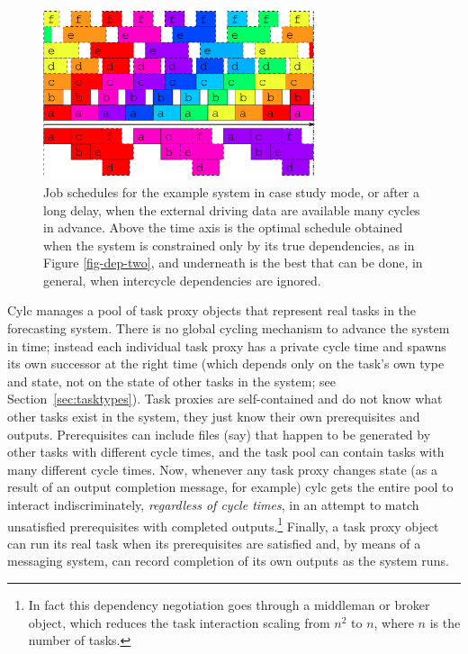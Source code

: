\documentclass[11pt,a4paper]{article}
\begin{document}
\begin{figure} 
    \begin{center} 
        \includegraphics[width=8cm]{inkscape-svg/timeline-two}
    \end{center} 
    \caption{\small Job schedules for the example system in case study
    mode, or after a long delay, when the external driving data are
    available many cycles in advance. Above the time axis is the optimal
    schedule obtained when the system is constrained only by its true
    dependencies, as in Figure \ref{fig-dep-two}, and underneath is
    the best that can be done, in general, when intercycle dependencies
    are ignored.} 
    \label{fig-time-two}
\end{figure} 

Cylc manages a pool of task proxy objects that represent real tasks in
the forecasting system. There is no global cycling mechanism to advance
the system in time; instead each individual task proxy has a private
cycle time and spawns its own successor at the right time (which depends
only on the task's own type and state, not on the state of other tasks
in the system; see Section~\ref{sec:tasktypes}). Task
proxies are self-contained and do not know what other tasks exist in the
system, they just know their own prerequisites and outputs.
Prerequisites can include files (say) that happen to be generated by
other tasks with different cycle times, and the task pool can contain
tasks with many different cycle times.  Now, whenever any task proxy
changes state (as a result of an output completion message, for example)
cylc gets the entire pool to interact indiscriminately, {\em regardless
of cycle times}, in an attempt to match unsatisfied prerequisites with
completed outputs.\footnote{In fact this dependency negotiation goes
through a middleman or broker object, which reduces the task interaction
scaling from $n^2$ to $n$, where $n$ is the number of tasks.} Finally, a
task proxy object can run its real task when its prerequisites are
satisfied and, by means of a messaging system, can record completion of
its own outputs as the system runs. 
\end{document}
